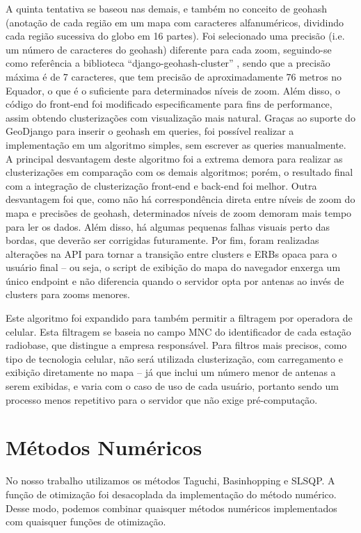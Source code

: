 \documentclass[]{politex}
\begin{document}
A quinta tentativa se baseou nas demais, e também no conceito de geohash
(anotação de cada região em um mapa com caracteres alfanuméricos, dividindo cada
região sucessiva do globo em 16 partes). Foi selecionado uma precisão (i.e. um
número de caracteres do geohash) diferente para cada zoom, seguindo-se como
referência a biblioteca  ``django-geohash-cluster'' \cite{geohashcluster}, sendo
que a precisão máxima é de 7 caracteres, que tem precisão de aproximadamente 76
metros no Equador, o que é o suficiente para determinados níveis de zoom.
Além disso, o código do front-end foi modificado especificamente para fins de
performance, assim obtendo clusterizações com visualização mais natural.
Graças ao suporte do GeoDjango para inserir o geohash em queries, foi possível
realizar a implementação em um algoritmo simples, sem escrever as queries
manualmente. A principal desvantagem deste algoritmo foi a extrema demora para
realizar as clusterizações em comparação com os demais algoritmos; porém, o
resultado final com a integração de clusterização front-end e back-end foi
melhor. Outra desvantagem foi que, como não há correspondência direta entre
níveis de zoom do mapa e precisões de geohash, determinados níveis de zoom
demoram mais tempo para ler os dados. Além disso, há algumas pequenas falhas
visuais perto das bordas, que deverão ser corrigidas futuramente. Por fim,
foram realizadas alterações na API para tornar a transição entre clusters e
ERBs opaca para o usuário final -- ou seja, o script de exibição do mapa do
navegador enxerga um único endpoint e não diferencia quando o servidor opta por
antenas ao invés de clusters para zooms menores.

Este algoritmo foi expandido para também permitir a filtragem por operadora de
celular. Esta filtragem se baseia no campo MNC do identificador de cada estação
radiobase, que distingue a empresa responsável. Para filtros mais precisos, como
tipo de tecnologia celular, não será utilizada clusterização, com carregamento e
exibição diretamente no mapa -- já que inclui um número menor de antenas a serem
exibidas, e varia com o caso de uso de cada usuário, portanto sendo um processo
menos repetitivo para o servidor que não exige pré-computação.

\section{Métodos Numéricos}
No nosso trabalho utilizamos os métodos Taguchi, Basinhopping e SLSQP.
A função de otimização foi desacoplada da implementação do método
numérico. Desse modo, podemos combinar quaisquer métodos numéricos implementados
com quaisquer funções de otimização.
\end{document}
